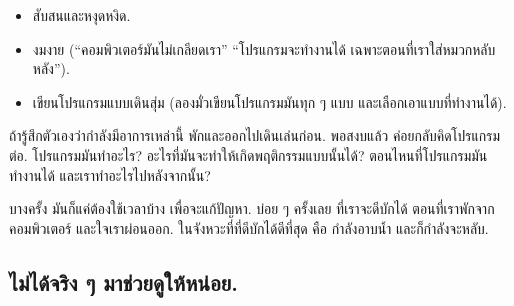 \begin{itemize}

\item สับสนและหงุดหงิด.

\item งมงาย (``คอมพิวเตอร์มันไม่เกลียดเรา''
``โปรแกรมจะทำงานได้ เฉพาะตอนที่เราใส่หมวกหลับหลัง'').

\item เขียนโปรแกรมแบบเดินสุ่ม
(ลองมั่วเขียนโปรแกรมมันทุก ๆ แบบ และเลือกเอาแบบที่ทำงานได้).

\end{itemize}


ถ้ารู้สึกตัวเองว่ากำลังมีอาการเหล่านี้
พักและออกไปเดินเล่นก่อน.
พอสงบแล้ว ค่อยกลับคิดโปรแกรมต่อ.
โปรแกรมมันทำอะไร?
อะไรที่มันจะทำให้เกิดพฤติกรรมแบบนั้นได้?
ตอนไหนที่โปรแกรมมันทำงานได้ และเราทำอะไรไปหลังจากนั้น?


บางครั้ง มันก็แค่ต้องใช้เวลาบ้าง เพื่อจะแก้ปัญหา.
บ่อย ๆ ครั้งเลย ที่เราจะดีบักได้ ตอนที่เราพักจากคอมพิวเตอร์ และใจเราผ่อนออก.
ในจังหวะที่ที่ดีบักได้ดีที่สุด
คือ กำลังอาบน้ำ และก็กำลังจะหลับ.

\subsection{ไม่ได้จริง ๆ มาช่วยดูให้หน่อย.}

